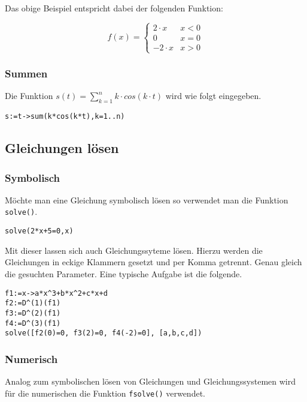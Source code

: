 \documentclass[a4paper,
               10pt,
               fleqn]{article}
\begin{document}
\noindent
Das obige Beispiel entspricht dabei der folgenden Funktion:

\begin{displaymath}
	f(x) = \left\{
		\begin{array}{lr}
			2 \cdot x &  x < 0 \\
			0 & x = 0 \\
			-2 \cdot x & x > 0
		\end{array}
        \right.
\end{displaymath}


\subsubsection{Summen}
Die Funktion $s(t)=\sum\limits_{k=1}^n k \cdot cos(k \cdot t) $ wird wie folgt
eingegeben.
\begin{lstlisting}[caption=Summen, label=Summen]
s:=t->sum(k*cos(k*t),k=1..n)
\end{lstlisting}

\subsection{Gleichungen lösen}

\subsubsection{Symbolisch}
Möchte man eine Gleichung symbolisch lösen so verwendet man die Funktion
\verb!solve()!.

\begin{lstlisting}[caption=Gleichung symbolisch, label=Gleichungen symbolisch I]
solve(2*x+5=0,x)
\end{lstlisting}

\noindent
Mit dieser lassen sich auch Gleichungssyteme lösen. Hierzu werden die 
Gleichungen in eckige Klammern gesetzt und per Komma getrennt. Genau gleich
die gesuchten Parameter. Eine typische Aufgabe ist die folgende.

\begin{lstlisting}[caption=Gleichungssystem, label=Gleichungssystem]
f1:=x->a*x^3+b*x^2+c*x+d
f2:=D^(1)(f1)
f3:=D^(2)(f1)
f4:=D^(3)(f1)
solve([f2(0)=0, f3(2)=0, f4(-2)=0], [a,b,c,d])
\end{lstlisting}

\subsubsection{Numerisch}
Analog zum symbolischen lösen von Gleichungen und Gleichungssystemen wird
für die numerischen die Funktion \verb!fsolve()! verwendet.
\end{document}

